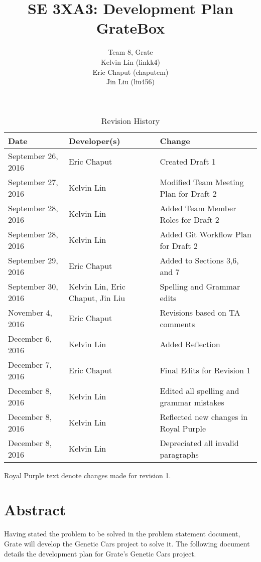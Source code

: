\documentclass{article}
\title{SE 3XA3: Development Plan\\GrateBox}
\author{Team 8, Grate
		\\ Kelvin Lin (linkk4)
		\\ Eric Chaput (chaputem)
		\\ Jin Liu (liu456)
}
\date{}
\begin{document}
\begin{table}[hp]
\caption{Revision History} \label{TblRevisionHistory}
\begin{tabularx}{\textwidth}{llX}
\toprule
\textbf{Date} & \textbf{Developer(s)} & \textbf{Change}\\
\midrule
September 26, 2016 & Eric Chaput & Created Draft 1\\
September 27, 2016 & Kelvin Lin & Modified Team Meeting Plan for Draft 2\\
September 28, 2016 & Kelvin Lin & Added Team Member Roles for Draft 2\\
September 28, 2016 & Kelvin Lin & Added Git Workflow Plan for Draft 2\\
September 29, 2016 & Eric Chaput & Added to Sections 3,6, and 7\\
September 30, 2016 & Kelvin Lin, Eric Chaput, Jin Liu & Spelling and Grammar 
edits\\
November 4, 2016 & Eric Chaput & Revisions based on TA comments\\
December 6, 2016 & Kelvin Lin & Added Reflection\\
December 7, 2016 & Eric Chaput & Final Edits for Revision 1\\
December 8, 2016 & Kelvin Lin & Edited all spelling and grammar mistakes\\
December 8, 2016 & Kelvin Lin & Reflected new changes in Royal Purple\\
December 8, 2016 & Kelvin Lin & Depreciated all invalid paragraphs\\
\bottomrule
\end{tabularx}
\end{table}

\newpage

\maketitle

\textcolor{RoyalPurple}{Royal Purple text denote changes made for revision 1.}

\section{Abstract}

Having stated the problem to be solved in the problem statement document, Grate 
will develop the Genetic Cars project to solve it. The following document 
details the development plan for Grate's Genetic Cars project.
\end{document}
